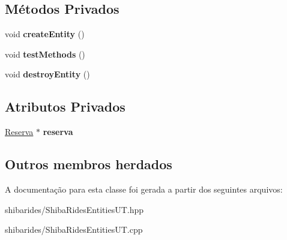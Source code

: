 \subsection*{Métodos Privados}
\begin{DoxyCompactItemize}
\item 
void {\bfseries create\+Entity} ()\hypertarget{classshibarides_1_1TUReserva_a266b7710ca60e8f7eef5403f30e035ed}{}\label{classshibarides_1_1TUReserva_a266b7710ca60e8f7eef5403f30e035ed}

\item 
void {\bfseries test\+Methods} ()\hypertarget{classshibarides_1_1TUReserva_a92a27b80ae98c5e2174a3ee821295b39}{}\label{classshibarides_1_1TUReserva_a92a27b80ae98c5e2174a3ee821295b39}

\item 
void {\bfseries destroy\+Entity} ()\hypertarget{classshibarides_1_1TUReserva_a384d2140f8846e0f49e98b6d7363b9f0}{}\label{classshibarides_1_1TUReserva_a384d2140f8846e0f49e98b6d7363b9f0}

\end{DoxyCompactItemize}
\subsection*{Atributos Privados}
\begin{DoxyCompactItemize}
\item 
\hyperlink{classshibarides_1_1Reserva}{Reserva} $\ast$ {\bfseries reserva}\hypertarget{classshibarides_1_1TUReserva_a81066f3e8c32477d0510c5ae6436dd87}{}\label{classshibarides_1_1TUReserva_a81066f3e8c32477d0510c5ae6436dd87}

\end{DoxyCompactItemize}
\subsection*{Outros membros herdados}


A documentação para esta classe foi gerada a partir dos seguintes arquivos\+:\begin{DoxyCompactItemize}
\item 
shibarides/Shiba\+Rides\+Entities\+U\+T.\+hpp\item 
shibarides/Shiba\+Rides\+Entities\+U\+T.\+cpp\end{DoxyCompactItemize}
